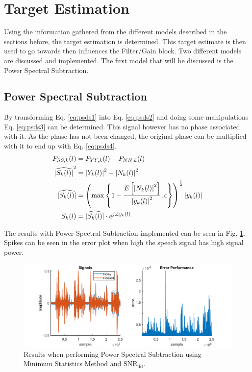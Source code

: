 \section{  Target Estimation} \label{sec:target_estimation}
Using the information gathered from the different models described in the sections before, the target estimation is determined. This target estimate is then used to go towards then influences the Filter/Gain block. Two different models are discussed and implemented. The first model that will be discussed is the Power Spectral Subtraction.

\subsection{Power Spectral Subtraction}
By transforming Eq. \ref{eq:psds1} into Eq. \ref{eq:psds2} and doing some manipulations Eq. \ref{eq:psds3} can be determined. This signal however has no phase associated with it. As the phase has not been changed, the original phase can be multiplied with it to end up with Eq. \ref{eq:psds4}.
\begin{align}
  P_{SS,k}(l) &= P_{YY,k}(l) - P_{NN,k}(l)
  \label{eq:psds1} \\
  \widehat{\abs{S_{k}(l)}}^{2} &= \abs{Y_{k}(l)}^{2}-\abs{N_{k}(l)}^{2}
  \label{eq:psds2} \\
  \widehat{\abs{S_{k}(l)}} &=
  \left(\max{\left\{1-\frac{E\left[\abs{N_{k}(l)}^{2}\right]}{\abs{y_{k}(l)}^{2}},\epsilon\right\}}\right)^{\frac{1}{2}}\abs{y_{k}(l)}
  \label{eq:psds3} \\
  S_{k}(l) &= \widehat{\abs{S_{k}(l)}} \cdot e^{j\measuredangle y_{k}(l)}
  \label{eq:psds4}
\end{align}

The results with Power Spectral Subtraction implemented can be seen in Fig. \ref{fig:PSS}. Spikes can be seen in the error plot when high the speech signal has high signal power.

\begin{figure}[h]
	\centering
	\includegraphics[width=\textwidth]{images/spectral_substraction.png}
	\caption{Results when performing Power Spectral Subtraction using Minimum Statistics Method and $\text{SNR}_{\text{dd}}$.}
	\label{fig:PSS}
\end{figure}
\clearpage

